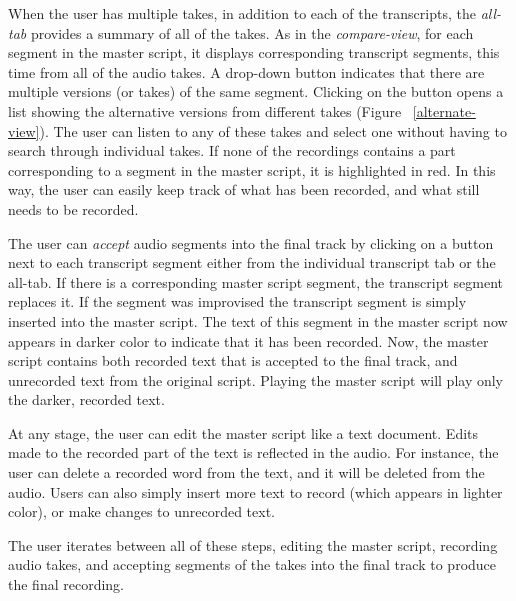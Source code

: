 When the user has multiple takes, in addition to each of the transcripts, the \textit{all-tab} provides a summary of all of the takes. As in the \textit{compare-view}, for each segment in the master script, it displays corresponding transcript segments, this time from all of the audio takes. A drop-down button indicates that there are multiple versions (or takes) of the same segment. Clicking on the button opens a
list showing the alternative versions from different takes (Figure ~\ref{alternate-view}). The user can listen to any of these takes and select one without having to search through individual takes. If none of the recordings contains a part corresponding to a segment in the master script, it is highlighted in red. In this way, the user can easily keep track of what has been recorded, and what still needs to be recorded.  

The user can \textit{accept} audio segments into the final track by clicking on a button next to each transcript segment either from the individual transcript tab or the all-tab. If there is a corresponding master script segment, the transcript segment replaces it. If the segment was improvised the transcript segment is simply inserted into the master script.
The text of this segment in the master script now appears in darker color to indicate that it has been recorded. Now, the master script contains both recorded text that is accepted to the final track, and unrecorded text from the original script.
Playing the master script will play only the darker, recorded text. 

 At any stage, the user can edit the master script like a text document. Edits made to the recorded part of the text is reflected in the audio. For instance, the user can delete a recorded word from the text, and it will be deleted from the audio.  Users can also simply insert more text to record (which appears in lighter color), or make changes to unrecorded text. 

The user iterates between all of these steps, editing the master script, recording audio takes, and accepting segments of the takes into the final track to produce the final recording.

